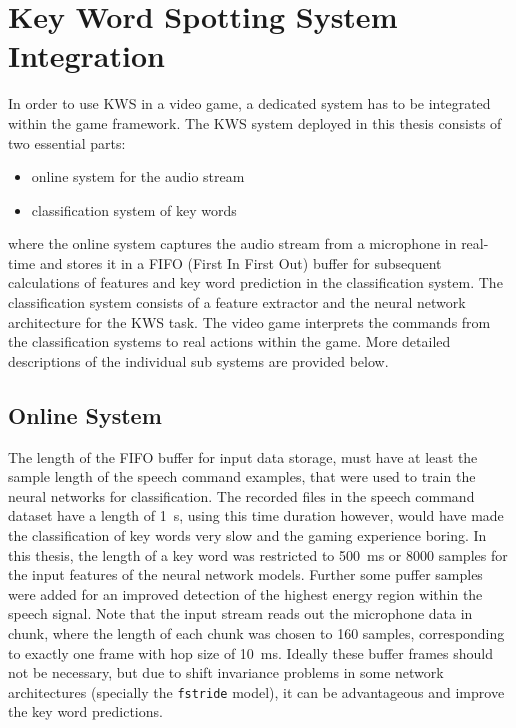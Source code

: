 
\section{Key Word Spotting System Integration}
\thesisStateReady
In order to use KWS in a video game, a dedicated system has to be integrated within the game framework.
The KWS system deployed in this thesis consists of two essential parts:
\begin{itemize}
	\item online system for the audio stream
	\item classification system of key words
\end{itemize}
where the online system captures the audio stream from a microphone in real-time and stores it in a FIFO (First In First Out) buffer for subsequent calculations of features and key word prediction in the classification system.
The classification system consists of a feature extractor and the neural network architecture for the KWS task.
The video game interprets the commands from the classification systems to real actions within the game.
More detailed descriptions of the individual sub systems are provided below.



\subsection{Online System}
The length of the FIFO buffer for input data storage, must have at least the sample length of the speech command examples, that were used to train the neural networks for classification.
The recorded files in the speech command dataset have a length of \SI{1}{\second}, using this time duration however, would have made the classification of key words very slow and the gaming experience boring.
In this thesis, the length of a key word was restricted to \SI{500}{\milli\second} or 8000 samples for the input features of the neural network models.
Further some puffer samples were added for an improved detection of the highest energy region within the speech signal.
Note that the input stream reads out the microphone data in chunk, where the length of each chunk was chosen to 160 samples, corresponding to exactly one frame with hop size of \SI{10}{\milli\second}.
Ideally these buffer frames should not be necessary, but due to shift invariance problems in some network architectures (specially the \texttt{fstride} model), it can be advantageous and improve the key word predictions.

